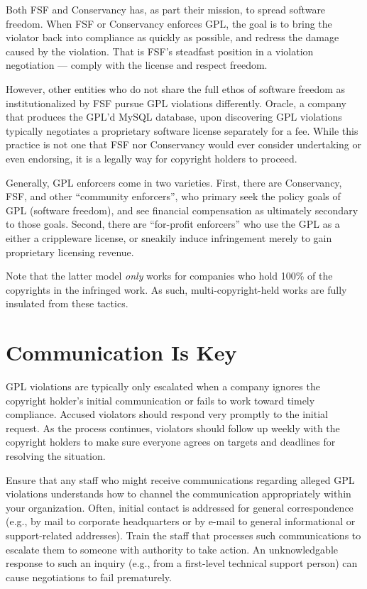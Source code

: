 Both  FSF and Conservancy has, as part their mission,  to spread software
freedom. When FSF or Conservancy
enforces GPL, the goal is to bring the violator back into compliance as
quickly as possible, and redress the damage caused by the violation.
That is FSF's steadfast position in a violation negotiation --- comply
with the license and respect freedom.

However, other entities who do not share the full ethos of software freedom
as institutionalized by FSF pursue GPL violations differently.  Oracle, a
company that produces the GPL'd MySQL database, upon discovering GPL
violations typically negotiates a proprietary software license separately for
a fee.  While this practice is not one that FSF nor Conservancy would ever
consider undertaking or even endorsing, it is a legally way for copyright
holders to proceed.

Generally, GPL enforcers come in two varieties.  First, there are
Conservancy, FSF, and other ``community enforcers'', who primary seek the
policy goals of GPL (software freedom), and see financial compensation as
ultimately secondary to those goals.  Second, there are ``for-profit
enforcers'' who use the GPL as a either a crippleware license, or sneakily
induce infringement merely to gain proprietary licensing revenue.

Note that the latter model \textit{only} works for companies who hold 100\% of
the copyrights in the infringed work.  As such, multi-copyright-held works
are fully insulated from these tactics.


\section{Communication Is Key}

GPL violations are typically only escalated when a company ignores the
copyright holder's initial communication or fails to work toward timely
compliance.  Accused violators should respond very promptly to the
initial request.  As the process continues, violators should follow up weekly with the
copyright holders to make sure everyone agrees on targets and deadlines
for resolving the situation.

Ensure that any staff who might receive communications regarding alleged
GPL violations understands how to channel the communication appropriately
within your organization.  Often, initial contact is addressed for general
correspondence (e.g., by mail to corporate headquarters or by e-mail to
general informational or support-related addresses).  Train the staff that
processes such communications to escalate them to someone with authority
to take action.  An unknowledgable response to such an inquiry (e.g., from
a first-level technical support person) can cause negotiations to fail
prematurely.

